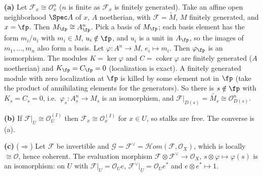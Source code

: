 \documentclass[11pt]{article}
\begin{document}
\pf
\textbf{(a)} Let $\mathcal F_x\cong\mathcal O_x^n$ ($n$ is finite as $\mathcal F_x$ is finitely generated). Take an affine open neighborhood $\Spec A$ of $x$, $A$ noetherian, with $\mathcal F=\widetilde M$, $M$ finitely generated, and $x=\fp$. Then $M_\fp\cong A_\fp^n$. Pick a basis of $M_\fp$; each basis element has the form $m_i/u_i$ with $m_i\in M$, $u_i\notin\fp$, and $u_i$ is a unit in $A_\fp$, so the images of $m_1,\dots,m_n$ also form a basis. Let $\varphi:A^n\to M$, $e_i\mapsto m_i$. Then $\varphi_\fp$ is an isomorphism. The modules $K=\ker\varphi$ and $C=\operatorname{coker}\varphi$ are finitely generated ($A$ noetherian) and $K_\fp=C_\fp=0$ (localization is exact). A finitely generated module with zero localization at $\fp$ is killed by some element not in $\fp$ (take the product of annihilating elements for the generators). So there is $s\notin\fp$ with $K_s=C_s=0$, i.e.\ $\varphi_s:A_s^n\to M_s$ is an isomorphism, and $\mathcal F|_{D(s)}=\widetilde{M_s}\cong\mathcal O_{D(s)}^n$.

\textbf{(b)} If $\mathcal F|_U\cong\mathcal O_U^{(I)}$ then $\mathcal F_x\cong\mathcal O_x^{(I)}$ for $x\in U$, so stalks are free. The converse is (a).

\textbf{(c)} ($\Rightarrow$) Let $\mathcal F$ be invertible and $\mathcal G=\mathcal F^\vee=\mathcal{H}om(\mathcal F,\mathcal O_X)$, which is locally $\cong\mathcal O$, hence coherent. The evaluation morphism $\mathcal F\otimes\mathcal F^\vee\to\mathcal O_X$, $s\otimes\varphi\mapsto\varphi(s)$ is an isomorphism: on $U$ with $\mathcal F|_U=\mathcal O_Ue$, $\mathcal F^\vee|_U=\mathcal O_Ue^*$ and $e\otimes e^*\mapsto1$.
\end{document}
